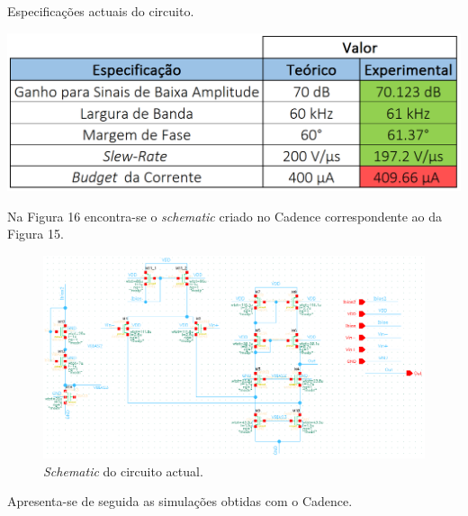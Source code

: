 \documentclass[11pt]{article}
\numberwithin{equation}{section}
\begin{document}
\begin{table}[H]
	\centering
	\caption{Especificações actuais do circuito.}
	\vspace{-1.5mm}
	\includegraphics[keepaspectratio=true, scale=0.40]{teoricas/specsajustesF1}
\end{table}


Na Figura 16 encontra-se o \textit{schematic} criado no Cadence correspondente ao da Figura 15.

\begin{figure}[H]
	\centering
	\includegraphics[keepaspectratio=true, scale=0.75]{exps/schematicajustesF1}
	\vspace{-0.5em}
	\caption{\textit{Schematic} do circuito actual.}
	\vspace{-0.8em}
\end{figure} 

Apresenta-se de seguida as simulações obtidas com o Cadence.
\end{document}
